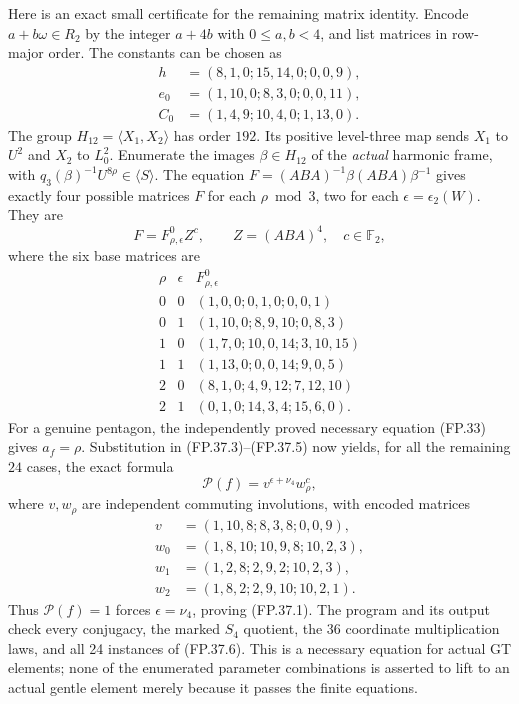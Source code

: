 Here is an exact small certificate for the remaining matrix
identity. Encode $a+b\omega\in R_2$ by the integer $a+4b$
with $0\leq a,b<4$, and list matrices in row-major order.
The constants can be chosen as
\[
\begin{split}
 h&=(8,1,0;15,14,0;0,0,9),\\
 e_0&=(1,10,0;8,3,0;0,0,11),\\
 C_0&=(1,4,9;10,4,0;1,13,0).
\end{split}
\]
The group $H_{12}=\langle X_1,X_2\rangle$ has order $192$.
Its positive level-three map sends $X_1$ to $U^2$ and $X_2$
to $L_0^2$. Enumerate the images $\beta\in H_{12}$ of the
\emph{actual} harmonic frame, with
$q_3(\beta)^{-1}U^{8\rho}\in\langle S\rangle$.
The equation $F=(ABA)^{-1}\beta(ABA)\beta^{-1}$ gives
exactly four possible matrices $F$ for each $\rho\bmod3$,
two for each $\epsilon=\epsilon_2(W)$. They are
\[
                   F=F^0_{\rho,\epsilon}Z^c,
             \qquad Z=(ABA)^4,\quad c\in\mathbb F_2,
\]
where the six base matrices are
\[
\begin{array}{c|c|l}
 \rho&\epsilon&F^0_{\rho,\epsilon}\\ \hline
0&0&(1,0,0;0,1,0;0,0,1)\\
0&1&(1,10,0;8,9,10;0,8,3)\\
1&0&(1,7,0;10,0,14;3,10,15)\\
1&1&(1,13,0;0,0,14;9,0,5)\\
2&0&(8,1,0;4,9,12;7,12,10)\\
2&1&(0,1,0;14,3,4;15,6,0).
\end{array}
\]
For a genuine pentagon, the independently proved necessary
equation (FP.33) gives $a_f=\rho$.
Substitution in (FP.37.3)--(FP.37.5)
now yields, for all the remaining $24$ cases, the exact formula
\[
                  \mathcal P(f)=v^{\epsilon+\nu_4}w_\rho^c,
 \tag{FP.37.6}
\]
where $v,w_\rho$ are independent commuting involutions, with
encoded matrices
\[
\begin{split}
 v&=(1,10,8;8,3,8;0,0,9),\\
 w_0&=(1,8,10;10,9,8;10,2,3),\\
 w_1&=(1,2,8;2,9,2;10,2,3),\\
 w_2&=(1,8,2;2,9,10;10,2,1).
\end{split}
\]
Thus $\mathcal P(f)=1$ forces $\epsilon=\nu_4$, proving
(FP.37.1). The program
 and its output
check every conjugacy, the marked $S_4$ quotient, the 36
coordinate multiplication laws, and all 24 instances of
(FP.37.6). This is a necessary equation for actual GT elements;
none of the enumerated parameter combinations is asserted to
lift to an actual gentle element merely because it passes the
finite equations.

